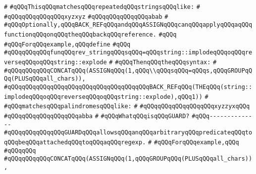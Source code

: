 \verb|#|\newline
\verb|#qQQqThisqQQqmatchesqQQqrepeatedqQQqstringsqQQqlike:|\newline
\verb|#|\newline
\verb|#qQQqqQQqqQQqqQQqxyzxyz|\newline
\verb|#qQQqqQQqqQQqqQQqabab|\newline
\verb|#|\newline
\verb|#qQQqOptionally,qQQqBACK_REFqQQqandqQQqASSIGNqQQqcanqQQqapplyqQQqaqQQqfunctionqQQqonqQQqtheqQQqbackqQQqreference.|\newline
\verb|#qQQq|\newline
\verb|#qQQqForqQQqexample,qQQqdefine|\newline
\verb|#qQQq|\newline
\verb|#qQQqqQQqqQQqfunqQQqrev_stringqQQqsqQQq=qQQqstring::implodeqQQqoqQQqreverseqQQqoqQQqstring::explode|\newline
\verb|#|\newline
\verb|#qQQqThenqQQqtheqQQqsyntax:|\newline
\verb|#|\newline
\verb|#qQQqqQQqqQQqCONCATqQQq(ASSIGNqQQq(1,qQQq\\qQQqsqQQq=qQQqs,qQQqGROUPqQQq(PLUSqQQqall_chars)),|\newline
\verb|#qQQqqQQqqQQqqQQqqQQqqQQqqQQqqQQqqQQqqQQqBACK_REFqQQq(THEqQQq(string::implodeqQQqoqQQqreverseqQQqoqQQqstring::explode),qQQq1))|\newline
\verb|#|\newline
\verb|#qQQqmatchesqQQqpalindromesqQQqlike:|\newline
\verb|#|\newline
\verb|#qQQqqQQqqQQqqQQqqQQqxyzzyxqQQq|\newline
\verb|#qQQqqQQqqQQqqQQqqQQqabba|\newline
\verb|#|\newline
\verb|#qQQqWhatqQQqisqQQqGUARD?|\newline
\verb|#qQQq--------------|\newline
\verb|#qQQqqQQqqQQqqQQqGUARDqQQqallowsqQQqanqQQqarbitraryqQQqpredicateqQQqtoqQQqbeqQQqattachedqQQqtoqQQqaqQQqregexp.|\newline
\verb|#|\newline
\verb|#qQQqForqQQqexample,qQQq|\newline
\verb|#qQQqqQQq|\newline
\verb|#qQQqqQQqqQQqCONCATqQQq(ASSIGNqQQq(1,qQQqGROUPqQQq(PLUSqQQqall_chars)),|\newline
